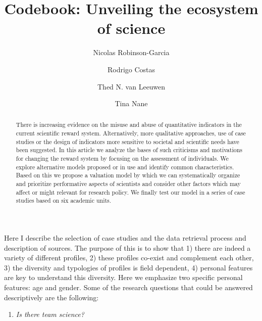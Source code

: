 \documentclass[]{elsarticle} %
\providecommand{\tightlist}{%
  \setlength{\itemsep}{0pt}\setlength{\parskip}{0pt}}
\begin{document}
\begin{frontmatter}

  \title{Codebook: Unveiling the ecosystem of science}
    \author[a]{Nicolas Robinson-Garcia}
    \author[b]{Rodrigo Costas}
  
  
    \author[b]{Thed N. van Leeuwen}
  
  
    \author[a]{Tina Nane}
  
  
      \address[a]{Applied Mathematics (DIAM), TU Delft, Delft, Netherlands}
    \address[b]{CWTS, Leiden University, Leiden, Netherlands}
  
  \begin{abstract}
  There is increasing evidence on the misuse and abuse of quantitative
  indicators in the current scientific reward system. Alternatively, more
  qualitative approaches, use of case studies or the design of indicators
  more sensitive to societal and scientific needs have been suggested. In
  this article we analyze the bases of such criticisms and motivations for
  changing the reward system by focusing on the assessment of individuals.
  We explore alternative models proposed or in use and identify common
  characteristics. Based on this we propose a valuation model by which we
  can systematically organize and prioritize performative aspects of
  scientists and consider other factors which may affect or might relevant
  for research policy. We finally test our model in a series of case
  studies based on six academic units.
  \end{abstract}
  
 \end{frontmatter}

Here I describe the selection of case studies and the data retrieval
process and description of sources. The purpose of this is to show that
1) there are indeed a variety of different profiles, 2) these profiles
co-exist and complement each other, 3) the diversity and typologies of
profiles is field dependent, 4) personal features are key to understand
this diversity. Here we emphasize two specific personal features: age
and gender. Some of the research questions that could be answered
descriptively are the following:

\begin{enumerate}
\def\labelenumi{\arabic{enumi}.}
\tightlist
\item
  \emph{Is there team science?}
\end{enumerate}
\end{document}

